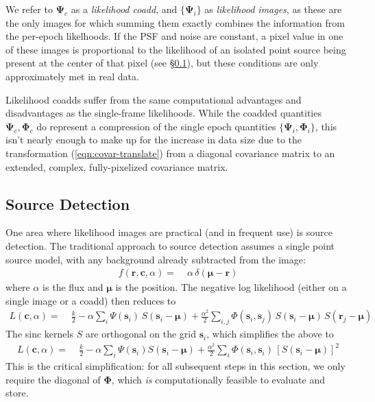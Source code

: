 \documentclass[10pt]{article}
\newcommand{\eqnref}[1]{(\ref{eqn:#1})}
\newcommand{\secref}[1]{\S\ref{sec:#1}}
\begin{document}
We refer to $\bm{\Psi}_c$ as a \emph{likelihood coadd}, and $\{\bm{\Psi}_i\}$ as \emph{likelihood images}, as these are the only images for which summing them exactly combines the information from the per-epoch likelhoods.  If the PSF and noise are constant, a pixel value in one of these images is proportional to the likelihood of an isolated point source being present at the center of that pixel (see \secref{detection}), but these conditions are only approximately met in real data.

Likelihood coadds suffer from the same computational advantages and disadvantages as the single-frame likelihoods.  While the coadded quantities $\bm{\Psi}_c,\bm{\Phi}_c$ do represent a compression of the single epoch quantities $\{\bm{\Psi}_i,\bm{\Phi}_i\}$, this isn't nearly enough to make up for the increase in data size due to the transformation \eqnref{covar-translate} from a diagonal covariance matrix to an extended, complex, fully-pixelized covariance matrix.


\subsection{Source Detection}
\label{sec:detection}

One area where likelihood images are practical (and in frequent use) is source detection.  The traditional approach to source detection assumes a single point source model, with any background already subtracted from the image:
\begin{align}
f(\bm{r},\bm{c},\alpha) =\;& \alpha\,\delta(\bm{\mu}-\bm{r})
\end{align}
where $\alpha$ is the flux and $\bm{\mu}$ is the position.  The negative log likelihood (either on a single image or a coadd) then reduces to
\begin{align}
L(\bm{c},\alpha) =\;& \frac{k}{2}
        - \alpha \sum_i \Psi(\bm{s}_i)\,S(\bm{s}_i-\bm{\mu})
        + \frac{\alpha^2}{2} \sum_{i,j}
            \Phi(\bm{s}_i,\bm{s}_j)\,S(\bm{s}_i-\bm{\mu})
                \,S(\bm{r}_j - \bm{\mu})
\end{align}
The sinc kernels $S$ are orthogonal on the grid $\bm{s}_i$, which simplifies the above to
\begin{align}
L(\bm{c},\alpha) =\;& \frac{k}{2}
        - \alpha \sum_i \Psi(\bm{s}_i) S(\bm{s}_i-\bm{\mu})
        + \frac{\alpha^2}{2} \sum_{i}
            \Phi(\bm{s}_i,\bm{s}_i)\,\left[S(\bm{s}_i-\bm{\mu})\right]^2
\end{align}
This is the critical simplification: for all subsequent steps in this section, we only require the diagonal of $\bm{\Phi}$, which \emph{is} computationally feasible to evaluate and store.
\end{document}
